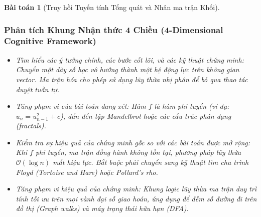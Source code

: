 \documentclass{article}
\newtheorem{baitoan}{Bài toán}
\begin{document}
\begin{baitoan}[Truy hồi Tuyến tính Tổng quát và Nhân ma trận Khối]
 \subsubsection*{Phân tích Khung Nhận thức 4 Chiều (4-Dimensional Cognitive Framework)}
 \begin{itemize}
 \item \textit{Tìm hiểu các ý tưởng chính, các bước cốt lõi, và các kỹ thuật chứng minh}: Chuyển một dãy số học vô hướng thành một hệ động lực trên không gian vector. Ma trận hóa cho phép sử dụng lũy thừa nhị phân để bỏ qua thao tác duyệt tuần tự.
 \item \textit{Tăng phạm vi của bài toán đang xét}: Hàm $f$ là hàm phi tuyến (ví dụ: $u_n = u_{n-1}^2 + c$), dẫn đến tập Mandelbrot hoặc các cấu trúc phân dạng (fractals).
 \item \textit{Kiểm tra sự hiệu quả của chứng minh gốc so với các bài toán được mở rộng}: Khi $f$ phi tuyến, ma trận đồng hành không tồn tại, phương pháp lũy thừa $\mathcal{O}(\log n)$ mất hiệu lực. Bắt buộc phải chuyển sang kỹ thuật tìm chu trình Floyd (Tortoise and Hare) hoặc Pollard's rho.
 \item \textit{Tăng phạm vi hiệu quả của chứng minh}: Khung logic lũy thừa ma trận duy trì tính tối ưu trên mọi vành đại số giao hoán, ứng dụng để đếm số đường đi trên đồ thị (Graph walks) và máy trạng thái hữu hạn (DFA).
 \end{itemize}
\end{baitoan}

\end{document}
